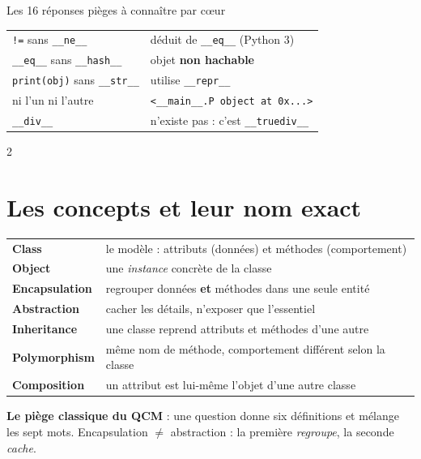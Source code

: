 \documentclass[a4paper,10pt]{article}
\newcommand{\co}[1]{\texttt{\textcolor{codefg}{#1}}}
\begin{document}
\begin{piegebox}{Les 16 réponses pièges à connaître par c\oe ur}
\begin{minipage}[t]{0.485\linewidth}
\begin{tabularx}{\linewidth}{@{}l>{\raggedright\arraybackslash}X@{}}
\co{!=} sans \co{\_\_ne\_\_}      & déduit de \co{\_\_eq\_\_} (Python 3) \\
\co{\_\_eq\_\_} sans \co{\_\_hash\_\_} & objet \textbf{non hachable} \\
\co{print(obj)} sans \co{\_\_str\_\_} & utilise \co{\_\_repr\_\_} \\
ni l'un ni l'autre        & \co{<\_\_main\_\_.P object at 0x...>} \\
\co{\_\_div\_\_}          & n'existe pas : c'est \co{\_\_truediv\_\_} \\
\bottomrule
\end{tabularx}
\end{minipage}
\end{piegebox}

\vspace{0.5em}
\begin{multicols}{2}

\section{Les concepts et leur nom exact}

\begin{tabularx}{\linewidth}{@{}l>{\raggedright\arraybackslash}X@{}}
\toprule
\textbf{Class}         & le modèle : attributs (données) et méthodes (comportement) \\
\textbf{Object}        & une \emph{instance} concrète de la classe \\
\textbf{Encapsulation} & regrouper données \textbf{et} méthodes dans une seule entité \\
\textbf{Abstraction}   & cacher les détails, n'exposer que l'essentiel \\
\textbf{Inheritance}   & une classe reprend attributs et méthodes d'une autre \\
\textbf{Polymorphism}  & même nom de méthode, comportement différent selon la classe \\
\textbf{Composition}   & un attribut est lui-même l'objet d'une autre classe \\
\bottomrule
\end{tabularx}

\vspace{0.4em}
\textbf{Le piège classique du QCM} : une question donne six définitions et
mélange les sept mots. Encapsulation $\neq$ abstraction : la première
\emph{regroupe}, la seconde \emph{cache}.


\end{multicols}
\end{document}
